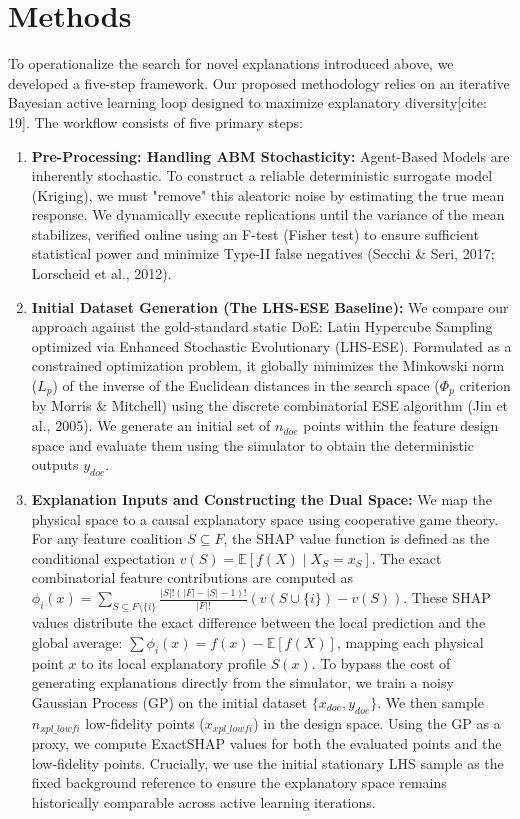 \documentclass[sn-mathphys]{sn-jnl}
\theoremstyle{thmstyleone}%
\theoremstyle{thmstyletwo}%
\theoremstyle{thmstylethree}%
\begin{document}
\section{Methods}
To operationalize the search for novel explanations introduced above, we developed a five-step framework. Our proposed methodology relies on an iterative Bayesian active learning loop designed to maximize explanatory diversity[cite: 19]. The workflow consists of five primary steps:

\begin{enumerate}
    \item \textbf{Pre-Processing: Handling ABM Stochasticity:} Agent-Based Models are inherently stochastic. To construct a reliable deterministic surrogate model (Kriging), we must "remove" this aleatoric noise by estimating the true mean response. We dynamically execute replications until the variance of the mean stabilizes, verified online using an F-test (Fisher test) to ensure sufficient statistical power and minimize Type-II false negatives (Secchi \& Seri, 2017; Lorscheid et al., 2012).
    
    \item \textbf{Initial Dataset Generation (The LHS-ESE Baseline):} We compare our approach against the gold-standard static DoE: Latin Hypercube Sampling optimized via Enhanced Stochastic Evolutionary (LHS-ESE). Formulated as a constrained optimization problem, it globally minimizes the Minkowski norm ($L_p$) of the inverse of the Euclidean distances in the search space ($\Phi_p$ criterion by Morris \& Mitchell) using the discrete combinatorial ESE algorithm (Jin et al., 2005). We generate an initial set of $n_{doe}$ points within the feature design space and evaluate them using the simulator to obtain the deterministic outputs $y_{doe}$.
    
    \item \textbf{Explanation Inputs and Constructing the Dual Space:} We map the physical space to a causal explanatory space using cooperative game theory. For any feature coalition $S \subseteq F$, the SHAP value function is defined as the conditional expectation $v(S) = \mathbb{E}[f(X) \mid X_S = x_S]$. The exact combinatorial feature contributions are computed as $\phi_i(x) = \sum_{S \subseteq F \setminus \{i\}} \frac{|S|! (|F| - |S| - 1)!}{|F|!} (v(S \cup \{i\}) - v(S))$. These SHAP values distribute the exact difference between the local prediction and the global average: $\sum \phi_i(x) = f(x) - \mathbb{E}[f(X)]$, mapping each physical point $x$ to its local explanatory profile $S(x)$. To bypass the cost of generating explanations directly from the simulator, we train a noisy Gaussian Process (GP) on the initial dataset $\{x_{doe}, y_{doe}\}$. We then sample $n_{xpl\_lowfi}$ low-fidelity points ($x_{xpl\_lowfi}$) in the design space. Using the GP as a proxy, we compute ExactSHAP values for both the evaluated points and the low-fidelity points. Crucially, we use the initial stationary LHS sample as the fixed background reference to ensure the explanatory space remains historically comparable across active learning iterations. 
    

\end{enumerate}
\end{document}
